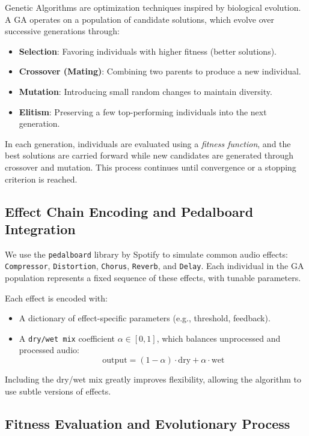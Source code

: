 \documentclass[masterthesis]{fer}
\begin{document}
Genetic Algorithms are optimization techniques inspired by biological evolution. A GA operates on a population of candidate solutions, which evolve over successive generations through:
\begin{itemize}
    \item \textbf{Selection}: Favoring individuals with higher fitness (better solutions).
    \item \textbf{Crossover (Mating)}: Combining two parents to produce a new individual.
    \item \textbf{Mutation}: Introducing small random changes to maintain diversity.
    \item \textbf{Elitism}: Preserving a few top-performing individuals into the next generation.
\end{itemize}

In each generation, individuals are evaluated using a \textit{fitness function}, and the best solutions are carried forward while new candidates are generated through crossover and mutation. This process continues until convergence or a stopping criterion is reached.


\subsection{Effect Chain Encoding and Pedalboard Integration}

We use the \texttt{pedalboard} library by Spotify to simulate common audio effects: \texttt{Compressor}, \texttt{Distortion}, \texttt{Chorus}, \texttt{Reverb}, and \texttt{Delay}. Each individual in the GA population represents a fixed sequence of these effects, with tunable parameters.

Each effect is encoded with:
\begin{itemize}
    \item A dictionary of effect-specific parameters (e.g., threshold, feedback).
    \item A \texttt{dry/wet mix} coefficient \( \alpha \in [0, 1] \), which balances unprocessed and processed audio:
    \[
    \text{output} = (1 - \alpha) \cdot \text{dry} + \alpha \cdot \text{wet}
    \]
\end{itemize}

Including the dry/wet mix greatly improves flexibility, allowing the algorithm to use subtle versions of effects.

\subsection{Fitness Evaluation and Evolutionary Process}
\end{document}
